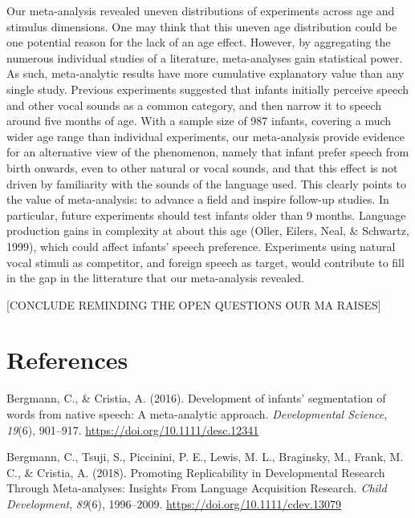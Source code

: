 \documentclass[man]{apa6}
\begin{document}
Our meta-analysis revealed uneven distributions of experiments across
age and stimulus dimensions. One may think that this uneven age
distribution could be one potential reason for the lack of an age
effect. However, by aggregating the numerous individual studies of a
literature, meta-analyses gain statistical power. As such, meta-analytic
results have more cumulative explanatory value than any single study.
Previous experiments suggested that infants initially perceive speech
and other vocal sounds as a common category, and then narrow it to
speech around five months of age. With a sample size of 987 infants,
covering a much wider age range than individual experiments, our
meta-analysis provide evidence for an alternative view of the
phenomenon, namely that infant prefer speech from birth onwards, even to
other natural or vocal sounds, and that this effect is not driven by
familiarity with the sounds of the language used. This clearly points to
the value of meta-analysis: to advance a field and inspire follow-up
studies. In particular, future experiments should test infants older
than 9 months. Language production gains in complexity at about this age
(Oller, Eilers, Neal, \& Schwartz, 1999), which could affect infants'
speech preference. Experiments using natural vocal stimuli as
competitor, and foreign speech as target, would contribute to fill in
the gap in the litterature that our meta-analysis revealed.

{[}CONCLUDE REMINDING THE OPEN QUESTIONS OUR MA RAISES{]}

\newpage

\section{References}\label{references}

\begingroup
\setlength{\parindent}{-0.5in} \setlength{\leftskip}{0.5in}

\hypertarget{refs}{}
\hypertarget{ref-bergmann_development_2016}{}
Bergmann, C., \& Cristia, A. (2016). Development of infants'
segmentation of words from native speech: A meta-analytic approach.
\emph{Developmental Science}, \emph{19}(6), 901--917.
\url{https://doi.org/10.1111/desc.12341}

\hypertarget{ref-bergmann_promoting_2018}{}
Bergmann, C., Tsuji, S., Piccinini, P. E., Lewis, M. L., Braginsky, M.,
Frank, M. C., \& Cristia, A. (2018). Promoting Replicability in
Developmental Research Through Meta-analyses: Insights From Language
Acquisition Research. \emph{Child Development}, \emph{89}(6),
1996--2009. \url{https://doi.org/10.1111/cdev.13079}
\end{document}
